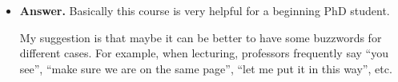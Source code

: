 \documentclass{article}
\begin{document}
\begin{itemize}
{\bf Answer.} Keep listening to different English resources, e.g., online classes, Rachel's English, NPR Podcasts, TED, etc. Also there are extensive opportunities to speak with professors and students on campus. There are also a lot of events, e.g., academic talks, conferences, lectures, in which I can practice my English listening and speaking.

\item 
{}

{\bf Answer.} Basically this course is very helpful for a beginning PhD student. 

My suggestion is that maybe it can be better to have some buzzwords for different cases. For example, when lecturing, professors frequently say ``you see'', ``make sure we are on the same page'', ``let me put it in this way'', etc.

\end{itemize}
\end{document}

